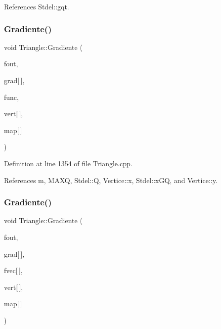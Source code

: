 References Stdel\+::gqt.

\mbox{\label{classTriangle_ac9b7a18bce51206aa978ec408fa9729c}} 
\subsubsection{\texorpdfstring{Gradiente()}{Gradiente()}\hspace{0.1cm}{\footnotesize\ttfamily [1/6]}}
{\footnotesize\ttfamily void Triangle\+::\+Gradiente (\begin{DoxyParamCaption}\item[{F\+I\+LE $\ast$}]{fout,  }\item[{double $\ast$}]{grad\mbox{[}$\,$\mbox{]},  }\item[{double($\ast$)(double, double, double)}]{func,  }\item[{const \hyperlink{structVertice}{Vertice}}]{vert\mbox{[}$\,$\mbox{]},  }\item[{const int}]{map\mbox{[}$\,$\mbox{]} }\end{DoxyParamCaption})\hspace{0.3cm}{\ttfamily [virtual]}}



Definition at line 1354 of file Triangle.\+cpp.



References m, M\+A\+XQ, Stdel\+::Q, Vertice\+::x, Stdel\+::x\+GQ, and Vertice\+::y.

\mbox{\label{classTriangle_af55fef533efd5d2a7b8f3954d5ad7dda}} 
\subsubsection{\texorpdfstring{Gradiente()}{Gradiente()}\hspace{0.1cm}{\footnotesize\ttfamily [2/6]}}
{\footnotesize\ttfamily void Triangle\+::\+Gradiente (\begin{DoxyParamCaption}\item[{F\+I\+LE $\ast$}]{fout,  }\item[{double $\ast$}]{grad\mbox{[}$\,$\mbox{]},  }\item[{const double}]{fvec\mbox{[}$\,$\mbox{]},  }\item[{const \hyperlink{structVertice}{Vertice}}]{vert\mbox{[}$\,$\mbox{]},  }\item[{const int}]{map\mbox{[}$\,$\mbox{]} }\end{DoxyParamCaption})\hspace{0.3cm}{\ttfamily [virtual]}}



